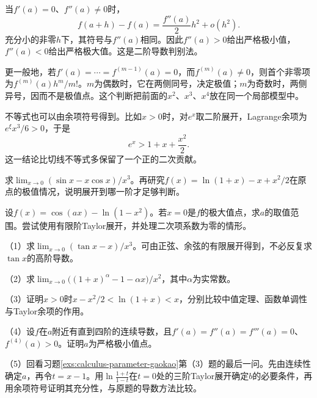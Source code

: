 当\(f'(a)=0\)、\(f''(a)\ne0\)时，
\begin{equation*}
 f(a+h)-f(a)=\frac{f''(a)}2h^2+o(h^2).
\end{equation*}
充分小的非零\(h\)下，其符号与\(f''(a)\)相同。因此\(f''(a)>0\)给出严格极小值，\(f''(a)<0\)给出严格极大值。这是{\heiti{}二阶导数判别法}。

更一般地，若\(f'(a)=\cdots=f^{(m-1)}(a)=0\)，而\(f^{(m)}(a)\ne0\)，则首个非零项为\(f^{(m)}(a)h^m/m!\)。\(m\)为偶数时，它在两侧同号，决定极值；\(m\)为奇数时，两侧异号，因而不是极值点。这个判断把前面的\(x^2\)、\(x^3\)、\(x^4\)放在同一个局部模型中。

不等式也可以由余项符号得到。比如\(x>0\)时，对\(e^x\)取二阶展开，Lagrange余项为\(e^\xi x^3/6>0\)，于是
\begin{equation*}
 e^x>1+x+\frac{x^2}2.
\end{equation*}
这一结论比切线不等式多保留了一个正的二次贡献。

\begin{example}
求\(\lim_{x\to0}(\sin x-x\cos x)/x^3\)。再研究\(f(x)=\ln(1+x)-x+x^2/2\)在原点的极值情况，说明展开到哪一阶才足够判断。
\end{example}

\begin{example}[2023年新课标II卷第22题第（2）问]
设\(f(x)=\cos(ax)-\ln(1-x^2)\)。若\(x=0\)是\(f\)的极大值点，求\(a\)的取值范围。尝试使用有限阶Taylor展开，并处理二次项系数为零的情形。
\end{example}

\begin{exercise}
\mbox{}\par\nobreak

（1）求\(\lim_{x\to0}(\tan x-x)/x^3\)。可由正弦、余弦的有限展开得到，不必反复求\(\tan x\)的高阶导数。

（2）求\(\lim_{x\to0}\bigl((1+x)^\alpha-1-\alpha x\bigr)/x^2\)，其中\(\alpha\)为实常数。

（3）证明\(x>0\)时\(x-x^2/2<\ln(1+x)<x\)，分别比较中值定理、函数单调性与Taylor余项的作用。

（4）设\(f\)在\(a\)附近有直到四阶的连续导数，且\(f'(a)=f''(a)=f'''(a)=0\)、\(f^{(4)}(a)>0\)。证明\(a\)为严格极小值点。

（5）回看习题\ref{exs:calculus-parameter-gaokao}第（3）题的最后一问。先由连续性确定\(a\)，再令\(t=x-1\)。用\(\ln\frac{1+t}{1-t}\)在\(t=0\)处的三阶Taylor展开确定\(b\)的必要条件，再用余项符号证明其充分性，与原题的导数方法比较。
\end{exercise}

